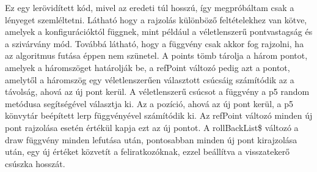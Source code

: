 Ez egy lerövidített kód, mivel az eredeti túl hosszú, így megpróbáltam csak a lényeget szemléltetni. Látható hogy a rajzolás különböző feltételekhez van kötve, amelyek a konfigurációktól függnek, mint például a véletlenszerű pontvastagság és a szivárvány mód. Továbbá látható, hogy a függvény csak akkor fog rajzolni, ha az algoritmus futása éppen nem szünetel. A points tömb tárolja a három pontot, amelyek a háromszöget határolják be, a refPoint változó pedig azt a pontot, amelytől a háromszög egy véletlenszerűen választott csúcsáig számítódik az a távolság, ahová az új pont kerül. A véletlenszerű csúcsot a függvény a p5 random metódusa segítségével választja ki. Az a pozíció, ahová az új pont kerül, a p5 könvytár beépített lerp függvényével számítódik ki. Az refPoint változó minden új pont rajzolása esetén értékül kapja ezt az új pontot. A rollBackList\$ változó a draw függvény minden lefutása után, pontosabban minden új pont kirajzolása után, egy új értéket közvetít a feliratkozóknak, ezzel beállítva a visszatekerő csúszka hosszát.
